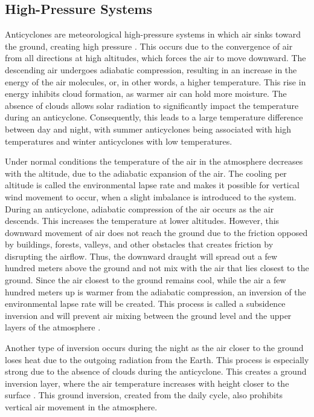\subsection{High-Pressure Systems}
Anticyclones are meteorological high-pressure systems in which air sinks toward the ground, creating high pressure \cite{spiridonovCyclonesAnticyclonesSpringerLink2020}. This occurs due to the convergence of air from all directions at high altitudes, which forces the air to move downward. The descending air undergoes adiabatic compression, resulting in an increase in the energy of the air molecules, or, in other words, a higher temperature. This rise in energy inhibits cloud formation, as warmer air can hold more moisture. The absence of clouds allows solar radiation to significantly impact the temperature during an anticyclone. Consequently, this leads to a large temperature difference between day and night, with summer anticyclones being associated with high temperatures and winter anticyclones with low temperatures. 

Under normal conditions the temperature of the air in the atmosphere decreases with the altitude, due to the adiabatic expansion of the air. The cooling per altitude is called the environmental lapse rate and makes it possible for vertical wind movement to occur, when a slight imbalance is introduced to the system. During an anticyclone, adiabatic compression of the air occurs as the air descends. This increases the temperature at lower altitudes. However, this downward movement of air does not reach the ground due to the friction opposed by buildings, forests, valleys, and other obstacles that creates friction by disrupting the airflow. Thus, the downward draught will spread out a few hundred meters above the ground and not mix with the air that lies closest to the ground. Since the air closest to the ground remains cool, while the air a few hundred meters up is warmer from the adiabatic compression, an inversion of the environmental lapse rate will be created. This process is called a subsidence inversion and will prevent air mixing between the ground level and the upper layers of the atmosphere \cite{gramschInfluenceSurfaceSubsidence2014}.


 Another type of inversion occurs during the night as the air closer to the ground loses heat due to the outgoing radiation from the Earth. This process is especially strong due to the absence of clouds during the anticyclone. This creates a ground inversion layer, where the air temperature increases with height closer to the surface \cite{gregohareWeatherClimateClimate2005}. This ground inversion, created from the daily cycle, also prohibits vertical air movement in the atmosphere.

